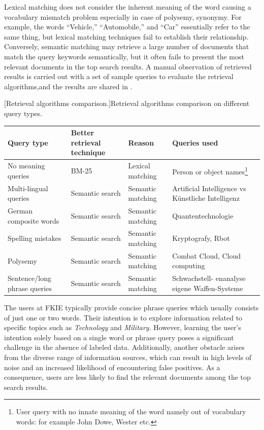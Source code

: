  Lexical matching does not consider the inherent meaning of the word causing a vocabulary mismatch problem especially in case of polysemy, synonymy. For example, the words ``Vehicle,'' ``Automobile,'' and ``Car'' essentially refer to the same thing, but lexical matching techniques fail to establish their relationship. Conversely, semantic matching may retrieve a large number of documents that match the query keywords semantically, but it often fails to present the most relevant documents in the top search results. A manual observation of retrieved results is carried out with a set of sample queries to evaluate the retrieval algorithms,and the results are shared in .



\begin{center}
	[Retrieval algorithms comparison.]{Retrieval algorithms comparison on different query types.}\label{tab:ir_system_comparison}
	\begin{tabularx}{.99\textwidth}{|Y|Y|Y|Y|}
		
		\hline
		  Query type & Better retrieval technique &  Reason &  Queries used  \\
		\hline
	 No meaning queries & BM-25 &  Lexical matching  & Person or object names\footnote{User query with no innate meaning of the word namely out of vocabulary words: for example John Dowe, Wester etc.} \\
		\hline
		 Multi-lingual queries & Semantic search &  Semantic matching & Artificial Intelligence vs Künstliche Intelligenz\\
		\hline
	 German composite words  & Semantic search&  Semantic matching & Quantentechnologie \\
		\hline
	 Spelling mistakes  &  Semantic search&  Semantic matching & Kryptografy, Rbot \\
		\hline
	 Polysemy  & Semantic search&  Semantic matching & Combat Cloud, Cloud computing \\
		\hline
	 Sentence/long phrase queries  & Semantic search&  Semantic matching  & Schwachstell-
		enanalyse eigene Waffen-Systeme \\
		\hline
		
	\end{tabularx}
\end{center}

The users at \ac{FKIE} typically provide concise phrase queries which usually consists of just one or two words. Their intention is to explore information related to specific topics such as \emph{Technology} and \emph{Military}. However, learning the user's intention solely based on a single word or phrase query poses a significant challenge in the absence of labeled data. Additionally, another obstacle arises from the diverse range of information sources, which can result in high levels of noise and an increased likelihood of encountering false positives. As a consequence, users are less likely to find the relevant documents among the top search results. 


